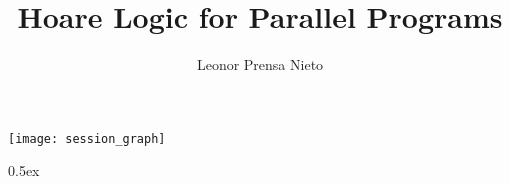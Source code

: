 \documentclass[11pt,a4paper]{book}
\begin{document}
\title{Hoare Logic for Parallel Programs}
\author{Leonor Prensa Nieto}
\maketitle

\pagestyle{plain}
\thispagestyle{empty}
\tableofcontents

\clearpage

\begin{center}
  \texttt{[image: session\_graph]}  
\end{center}

\newpage

\parindent 0pt\parskip 0.5ex


%
%
\end{document}
